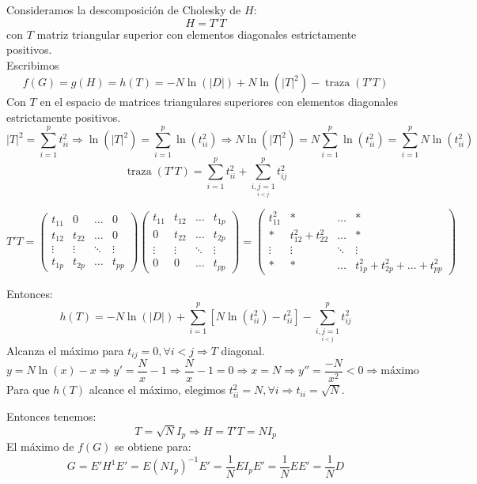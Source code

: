 \documentclass[11pt,a4paper]{article}
\begin{document}
\begin{itemize}
Consideramos la descomposición de Cholesky de $H$:
$$H = T'T$$
con $T$ matriz triangular superior con elementos diagonales estrictamente positivos. \\
Escribimos
$$f(G) = g(H) = h(T) = -N\ln(|D|) + N\ln(|T|^{2}) - \operatorname{traza}(T'T)$$
Con $T$ en el espacio de matrices triangulares superiores con elementos diagonales estrictamente positivos.
$$|T|^{2} = \sum_{i=1}^{p} t_{ii}^{2} \Rightarrow \ln(|T|^{2}) = \sum_{i=1}^{p} \ln(t_{ii}^{2}) \Rightarrow N\ln(|T|^{2}) = N\sum_{i=1}^{p}\ln(t_{ii}^{2}) = \sum_{i=1}^{p}N\ln(t_{ii}^{2})$$
$$\operatorname{traza}(T'T) = \sum_{i=1}^{p} t_{ii}^{2} + \sum_{\underset{i<j}{i,j=1}}^{p}t_{ij}^{2}$$
\begin{small}
$$T'T = \begin{pmatrix}
t_{11} & 0 & \dots & 0 \\
t_{12} & t_{22} & \dots & 0 \\
\vdots & \vdots & \ddots & \vdots \\
t_{1p} & t_{2p} & \dots & t_{pp}
\end{pmatrix} \begin{pmatrix}
t_{11} & t_{12} & \dots & t_{1p} \\
0 & t_{22} & \dots & t_{2p} \\
\vdots & \vdots & \ddots & \vdots \\
0 & 0 &\dots & t_{pp}
\end{pmatrix} = \begin{pmatrix}
t_{11}^{2} & * & \dots & * \\
* & t_{12}^{2} + t_{22}^{2} & \dots & * \\
\vdots & \vdots & \ddots & \vdots \\
* & * & \dots & t_{1p}^{2} + t_{2p}^{2} + \dots + t_{pp}^{2}
\end{pmatrix}$$
\end{small}
Entonces:
$$h(T) = -N\ln(|D|) + \sum_{i=1}^{p}[N\ln(t_{ii}^{2}) - t_{ii}^{2}] - \sum_{\underset{i<j}{i, j=1}}^{p} t_{ij}^{2}$$
Alcanza el máximo para $t_{ij} = 0, \forall i < j \Rightarrow T$ diagonal.
$$y = N\ln(x) - x \Rightarrow y' = \frac{N}{x} - 1 \Rightarrow \frac{N}{x} - 1 = 0 \Rightarrow x = N \Rightarrow y'' = \frac{-N}{x^{2}} < 0 \Rightarrow \text{máximo}$$
Para que $h(T)$ alcance el máximo, elegimos $t_{ii}^{2} = N, \forall i \Rightarrow t_{ii} = \sqrt{N}$.

Entonces tenemos:
$$T = \sqrt{N}I_{p} \Rightarrow H = T'T = NI_{p}$$
El máximo de $f(G)$ se obtiene para:
$$G = E'H^{1}E' = E(NI_{p})^{-1}E' = \frac{1}{N}EI_{p}E' = \frac{1}{N}EE' = \frac{1}{N}D$$


\end{itemize}
\end{document}
